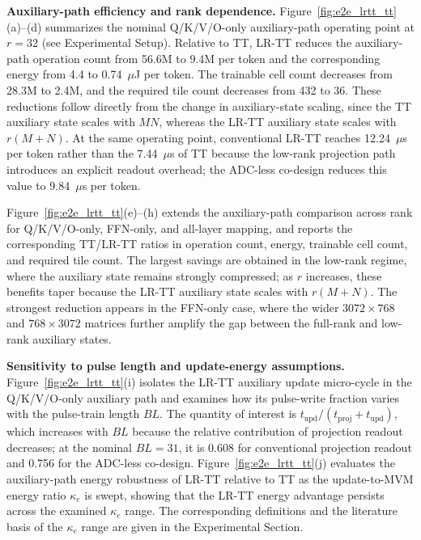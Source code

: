\documentclass[AMA,LATO2COL]{WileyNJDv5}
\begin{document}
\noindent\textbf{Auxiliary-path efficiency and rank dependence.}
Figure~\ref{fig:e2e_lrtt_tt}(a)--(d) summarizes the nominal Q/K/V/O-only auxiliary-path operating point at \(r=32\) (see Experimental Setup). Relative to TT, LR-TT reduces the auxiliary-path operation count from 56.6M to 9.4M per token and the corresponding energy from 4.4 to 0.74~\(\mu\)J per token. The trainable cell count decreases from 28.3M to 2.4M, and the required tile count decreases from 432 to 36. These reductions follow directly from the change in auxiliary-state scaling, since the TT auxiliary state scales with \(MN\), whereas the LR-TT auxiliary state scales with \(r(M+N)\). At the same operating point, conventional LR-TT reaches 12.24~\(\mu\)s per token rather than the 7.44~\(\mu\)s of TT because the low-rank projection path introduces an explicit readout overhead; the ADC-less co-design reduces this value to 9.84~\(\mu\)s per token.

\noindent
Figure~\ref{fig:e2e_lrtt_tt}(e)--(h) extends the auxiliary-path comparison across rank for Q/K/V/O-only, FFN-only, and all-layer mapping, and reports the corresponding TT/LR-TT ratios in operation count, energy, trainable cell count, and required tile count. The largest savings are obtained in the low-rank regime, where the auxiliary state remains strongly compressed; as \(r\) increases, these benefits taper because the LR-TT auxiliary state scales with \(r(M+N)\). The strongest reduction appears in the FFN-only case, where the wider \(3072\times768\) and \(768\times3072\) matrices further amplify the gap between the full-rank and low-rank auxiliary states.

\noindent\textbf{Sensitivity to pulse length and update-energy assumptions.}
Figure~\ref{fig:e2e_lrtt_tt}(i) isolates the LR-TT auxiliary update micro-cycle in the Q/K/V/O-only auxiliary path and examines how its pulse-write fraction varies with the pulse-train length \(BL\). The quantity of interest is \(t_{\mathrm{upd}}/(t_{\mathrm{proj}}+t_{\mathrm{upd}})\), which increases with \(BL\) because the relative contribution of projection readout decreases; at the nominal \(BL=31\), it is 0.608 for conventional projection readout and 0.756 for the ADC-less co-design. Figure~\ref{fig:e2e_lrtt_tt}(j) evaluates the auxiliary-path energy robustness of LR-TT relative to TT as the update-to-MVM energy ratio \(\kappa_e\) is swept, showing that the LR-TT energy advantage persists across the examined \(\kappa_e\) range. The corresponding definitions and the literature basis of the \(\kappa_e\) range are given in the Experimental Section.
\end{document}

